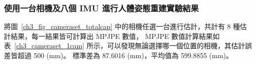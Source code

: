 \subsubsection{使用一台相機及八個 IMU 進行人體姿態重建實驗結果}
將圖~\ref{ch3_fig_cameraset_totalcap} 中的相機任選一台進行估計，共計有 8 種估計結果，每一結果皆可計算出 MPJPE 數值，
MPJPE 數值計算結果如表~\ref{ch3_cameraset_1cam} 所示，可以發現無論選擇哪一個位置的相機，其估計誤差皆超過 500 (mm)。
標準差為 87.6016 (mm)，平均值為 599.8855 (mm)。
\begin{table}[!ht]
   \caption[一台相機組合與其估計結果誤差]{一台相機組合與其估計結果誤差}
   \centering
   \label{ch3_cameraset_1cam}
   \setlength{\tabcolsep}{3pt}
   \renewcommand\arraystretch{1.5}
\end{table}
\clearpage

